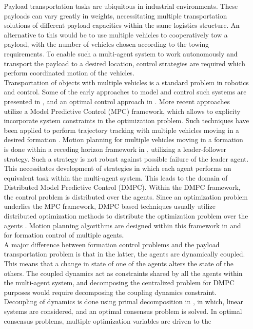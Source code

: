 \documentclass[letterpaper, 10 pt, conference]{ieeeconf}
\begin{document}
Payload transportation tasks are ubiquitous in industrial environments. These payloads can vary greatly in weights, necessitating multiple transportation solutions of different payload capacities within the same logistics structure. An alternative to this would be to use multiple vehicles to cooperatively tow a payload, with the number of vehicles chosen according to the towing requirements. To enable such a multi-agent system to work autonomously and transport the payload to a desired location, control strategies are required which perform coordinated motion of the vehicles.
\\
\indent Transportation of objects with multiple vehicles is a standard problem in robotics and control. Some of the early approaches to model and control such systems are presented in \cite{c1,c2,c3}, and an optimal control approach in \cite{c4}. More recent approaches utilize a Model Predictive Control (MPC) framework, which allows to explicity incorporate system constraints in the optimization problem. Such techniques have been applied to perform trajectory tracking with multiple vehicles moving in a desired formation \cite{c5}. Motion planning for multiple vehicles moving in a formation is done within a receding horizon framework in \cite{c6}, utilizing a leader-follower strategy. Such a strategy is not robust against possible failure of the leader agent. This necessitates development of strategies in which each agent performs an equivalent task within the multi-agent system. This leads to the domain of Distributed Model Predictive Control (DMPC). Within the DMPC framework, the control problem is distributed over the agents. Since an optimization problem underlies the MPC framework, DMPC based techniques usually utilize distributed optimization methods to distribute the optimization problem over the agents \cite{c7}. Motion planning algorithms are designed within this framework in \cite{c8} and \cite{c16} for formation control of multiple agents.
\\
\indent
 A major difference between formation control problems and the payload transportation problem is that in the latter, the agents are dynamically coupled. This means that a change in state of one of the agents alters the state of the others. The coupled dynamics act as constraints shared by all the agents within the multi-agent system, and decomposing the centralized problem for DMPC purposes would require decomposing the coupling dynamics constraint. Decoupling of dynamics is done using primal decomposition
 in \cite{c10}, in which, linear systems are considered, and an optimal consensus problem is solved. In optimal consensus problems, multiple optimization variables are driven to the
\end{document}

